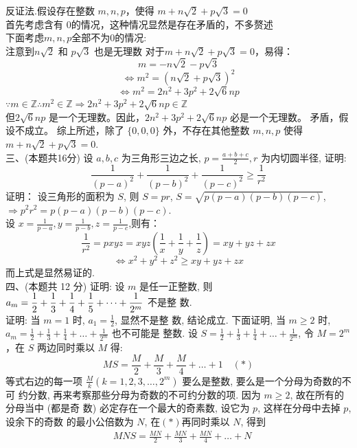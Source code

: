 \documentclass[a4paper,11pt,UTF8]{article}
\begin{document}
反证法.假设存在整数 $m, n, p$，使得 $m + n\sqrt{2} + p\sqrt{3} = 0$\\
首先考虑含有 $0$的情况，这种情况显然是存在矛盾的，不多赘述\\
下面考虑$m, n, p$全部不为$0$的情况:\\
注意到$n\sqrt{2}$ 和 $p\sqrt{3}$ 也是无理数
对于$m + n\sqrt{2} + p\sqrt{3} = 0$，易得：
$$m = -n\sqrt{2} - p\sqrt{3}$$
$$\Leftrightarrow m^2 = (n\sqrt{2} + p\sqrt{3})^2$$
$$\Leftrightarrow m^2 = 2n^2 + 3p^2 + 2\sqrt{6}np$$
$\because m\in\mathbb{Z}\therefore m^2\in\mathbb{Z}\Rightarrow 2n^2 + 3p^2 + 2\sqrt{6}np\in\mathbb{Z}$\\
但$2\sqrt{6}np$ 是一个无理数。因此，$2n^2 + 3p^2 + 2\sqrt{6}np$ 必是一个无理数。
矛盾，假设不成立。
综上所述，除了 $\{0, 0, 0\}$ 外，不存在其他整数 $m, n, p$ 使得 $m + n\sqrt{2} + p\sqrt{3} = 0$.\\
三、(本题共16分) 设 $a, b, c$ 为三角形三边之长, $\displaystyle p=\frac{a+b+c}{2}, r$ 为内切圆半径, 证明:
$$
\frac{1}{(p-a)^2}+\frac{1}{(p-b)^2}+\frac{1}{(p-c)^2} \geqslant \frac{1}{r^2}
$$
证明： 设三角形的面积为 $S$, 则 $S=p r$, $S=\sqrt{p(p-a)(p-b)(p-c)}$,\\
 $\Rightarrow p^2 r^2=p(p-a)(p-b)(p-c)$.
\\设 $\displaystyle x=\frac{1}{p-a}, y=\frac{1}{p-b}, z=\frac{1}{p-c}$,则有：
$$
\frac{1}{r^2}=p x y z=x y z\left(\frac{1}{x}+\frac{1}{y}+\frac{1}{z}\right)=x y+y z+z x$$
$$
\Leftrightarrow x^2+y^2+z^2 \geqslant x y+y z+z x   
$$
而上式是显然易证的.\\
四、(本题共 12 分) 证明: 设 $m$ 是任一正整数, 则 $\displaystyle \displaystyle a_m=\frac{1}{2}+\frac{1}{3}+\frac{1}{4}+\frac{1}{5}+\cdots+\frac{1}{2^m}$ 不是整 数.\\
证明: 当 $m=1$ 时, $\displaystyle a_1=\frac{1}{2}$, 显然不是整 数, 结论成立.
下面证明, 当 $m \geqslant 2$ 时,
$\displaystyle a_m=\frac{1}{2}+\frac{1}{3}+\frac{1}{4}+\ldots+\frac{1}{2^m}$ 也不可能是 整数.
设 $\displaystyle S=\frac{1}{2}+\frac{1}{3}+\frac{1}{4}+\ldots+\frac{1}{2^m}$, 令 $M=2^m$ ，在 $S$ 两边同时乘以 $M$ 得:
$$
M S=\frac{M}{2}+\frac{M}{3}+\frac{M}{4}+\ldots+1\quad(*)
$$
等式右边的每一项 $\displaystyle\frac{M}{k}\left(k=1,2,3, \ldots, 2^m\right)$
要么是整数, 要么是一个分母为奇数的不可 约分数,
再来考察那些分母为奇数的不可约分数的项.
因为 $m \geqslant 2$, 故在所有的分母当中 (都是奇
数) 必定存在一个最大的奇素数,
设它为 $p$, 这样在分母中去掉 $p$, 设余下的奇数 的最小公倍数为 $N$,
在$(*)$再同时乘以 $N$, 得到
$$
\begin{aligned}
	& M N S=\frac{M N}{2}+\frac{M N}{3}+\frac{M N}{4}+\ldots +N
\end{aligned}
$$
\end{document}
